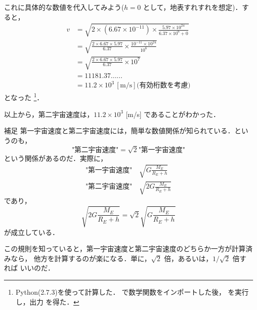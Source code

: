             これに具体的な数値を代入してみよう($h=0$ として，地表すれすれを想定)．すると，
                \begin{align*}
                    v &= \sqrt{2 \times (6.67 \times 10^{-11}) \times \frac{5.97 \times 10^{24}}{6.37 \times 10^{6}+0}} \\
                      &= \sqrt{\frac{2 \times 6.67 \times 5.97}{6.37} \times \frac{10^{-11} \times 10^{24}}{10^{6}}}    \\
                      &= \sqrt{\frac{2 \times 6.67 \times 5.97}{6.37} \times 10^{7}}   \\
                      &= 11181.37  ...... \\
                      &= 11.2 \times 10^{3} \,\mathrm{[m/s]}\mbox{(有効桁数を考慮)}
                \end{align*}
            となった
                \footnote{
                    Python(2.7.3)を使って計算した． で数学関数をインポートした後，
                     を実行し，出力 を得た．
                }．

            以上から，第二宇宙速度は，$11.2 \times 10^{3}$ [m/s] であることがわかった．

            \begin{memo}{補足}
                第一宇宙速度と第二宇宙速度には，簡単な数値関係が知られている．というのも，
                    \begin{equation*}
                        \mbox{"第二宇宙速度"} = \sqrt{2}\mbox{"第一宇宙速度"}
                    \end{equation*}
                という関係があるのだ．実際に，
                \begin{align*}
                    \mbox{"第一宇宙速度"} \quad \sqrt{G\frac{M_{E}}{R_{E}+h}}  \\
                    \mbox{"第二宇宙速度"} \quad \sqrt{2G\frac{M_{E}}{R_{E}+h}}
                \end{align*}
                であり，
                    \begin{equation*}
                        \sqrt{2G\frac{M_{E}}{R_{E}+h}} = \sqrt{2} \sqrt{G\frac{M_{E}}{R_{E}+h}}
                    \end{equation*}
                が成立している．

                この規則を知っていると，第一宇宙速度と第二宇宙速度のどちらか一方が計算済みなら，
                他方を計算するのが楽になる．単に，$\sqrt{2}$ 倍，あるいは，$1/\sqrt{2}$ 倍すれば
                いいのだ．
            \end{memo}


